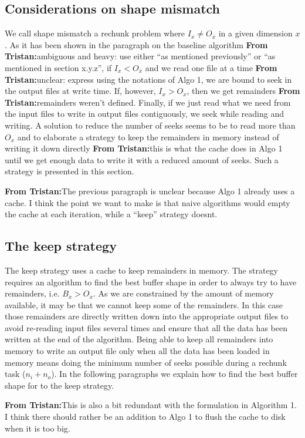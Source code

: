 \documentclass[conference]{IEEEtran}
\newcommand{\tristan}[1]{\color{orange}\textbf{From Tristan:}#1\color{black}}
\begin{document}
\subsection{Considerations on shape mismatch}
We call shape mismatch a rechunk problem where $I_x \neq O_x$ in a given dimension $x$. As it
has been shown in the paragraph on the baseline algorithm \tristan{ambiguous and heavy: use either ``as mentioned previously'' or ``as mentioned in section x.y.z''}, if $I_x < O_x$ and
we read one file at a time \tristan{unclear: express using the notations of Algo 1}, we are bound to seek in the output files at
write time. If, however, $I_x > O_x$, then we get remainders \tristan{remainders weren't defined}. Finally, if we
just read what we need from the input files to write in output files
contiguously, we seek while reading and writing. A solution to reduce the
number of seeks seems to be to read more than $O_x$ and to elaborate a strategy
to keep the remainders in memory instead of writing it down directly \tristan{this is what the cache does in Algo 1} until we
get enough data to write it with a reduced amount of seeks. Such a strategy is
presented in this section.

\tristan{The previous paragraph is unclear because Algo 1 already uses a cache. I think the point we want to make is that
naive algorithms would empty the cache at each iteration, while a ``keep'' strategy doesnt.}

\subsection{The keep strategy}
The keep strategy uses a cache to keep remainders in memory.
The strategy requires an algorithm to find the best buffer shape in order to
always try to have remainders, i.e. $B_x>O_x$. As we are constrained by the
amount of memory available, it may be that we cannot keep some of the remainders.
In this case those remainders are directly written down into the appropriate
output files to avoid re-reading input files several times and ensure that all
the data has been written at the end of the algorithm. Being able to keep all
remainders into memory to write an output file only when all the data has been
loaded in memory means doing the minimum number of seeks possible during a
rechunk task ($n_i + n_o$). In the following paragraphs we explain how to find
the best buffer shape for to the keep strategy.

\tristan{This is also a bit redundant with the formulation in Algorithm 1.
I think there should rather be an addition to Algo 1 to flush the cache to disk when it is too big.}
\end{document}
